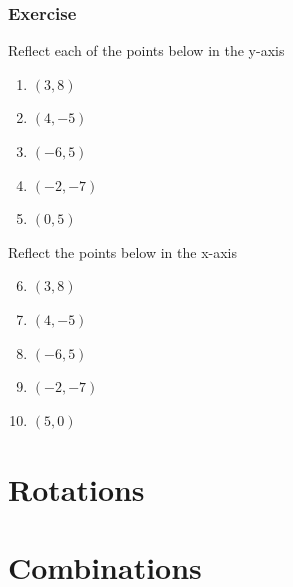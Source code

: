\subsubsection{Exercise}
Reflect each of the points below in the y-axis
	\begin{enumerate}
		\item $(3, 8)$
		\item $(4, -5)$
		\item $(-6, 5)$
		\item $(-2, -7)$
		\item $(0, 5)$
	\end{enumerate}
	Reflect the points below in the x-axis
	\begin{enumerate}
		\setcounter{enumi}{5}
		\item $(3, 8)$
		\item $(4, -5)$
		\item $(-6, 5)$
		\item $(-2, -7)$
		\item $(5, 0)$
	\end{enumerate}

\section{Rotations}
\section{Combinations}
